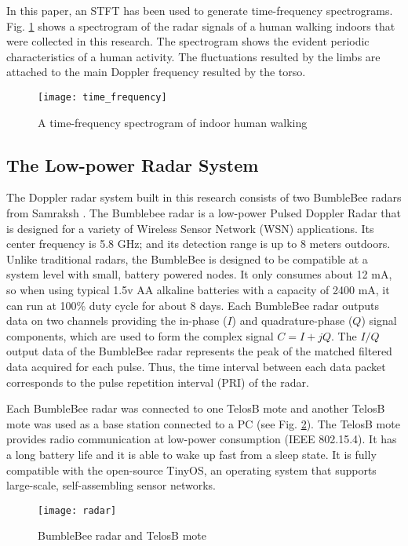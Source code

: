 In this paper, an STFT has been used to generate time-frequency spectrograms. Fig. \ref{fig_tf0} shows a spectrogram of the radar signals of a human walking indoors that were collected in this research. The spectrogram shows the evident periodic characteristics of a human activity. The fluctuations resulted by the limbs are attached to the main Doppler frequency resulted by the torso. 
\begin{figure}[!t]
\centering
\texttt{[image: time\_frequency]}
\centering
\caption{A time-frequency spectrogram of indoor human walking}
\label{fig_tf0}
\end{figure}

\subsection{The Low-power Radar System}
The Doppler radar system built in this research consists of two BumbleBee radars from Samraksh \cite{bumblebee}. The Bumblebee radar is a low-power Pulsed Doppler Radar that is designed for a variety of Wireless Sensor Network (WSN) applications. Its center frequency is 5.8 GHz; and its detection range is up to 8 meters outdoors. Unlike traditional radars, the BumbleBee is designed to be compatible at a system level with small, battery powered nodes. It only consumes about 12 mA, so when using typical 1.5v AA alkaline batteries with a capacity of 2400 mA, it can run at 100\% duty cycle for about 8 days. Each BumbleBee radar outputs data on two channels providing the in-phase  ($I$) and quadrature-phase ($Q$) signal components, which are used to form the complex signal $C=I+jQ$. The $I/Q$ output data of the BumbleBee radar represents the peak of the matched filtered data acquired for each pulse. Thus, the time interval between each data packet corresponds to the pulse repetition interval (PRI) of the radar.

Each BumbleBee radar was connected to one TelosB mote \cite{polastre2005telos} and another TelosB mote was used as a base station connected to a PC (see Fig. \ref{fig_radar}). The TelosB mote provides radio communication at low-power consumption (IEEE 802.15.4).  It has a long battery life and it is able to wake up fast from a sleep state. It is fully compatible with the open-source TinyOS, an operating system that supports large-scale, self-assembling sensor networks.
\begin{figure}[!t]
\centering
\texttt{[image: radar]}
\centering
\caption{BumbleBee radar and TelosB mote}
\label{fig_radar}
\end{figure}

